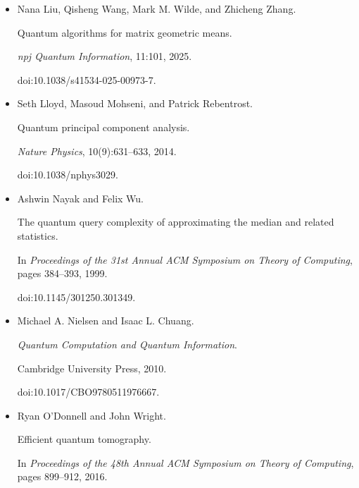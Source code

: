 \documentclass[10pt,a4paper]{article}
\begin{document}
\begin{itemize}
\emph{Computational Complexity}, 2026.


doi:10.1007/s00037-025-00284-5.





\item[] 
[30]

Nana Liu, Qisheng Wang, Mark M. Wilde, and Zhicheng Zhang.


Quantum algorithms for matrix geometric means.


\emph{npj Quantum Information}, 11:101, 2025.


doi:10.1038/s41534-025-00973-7.





\item[] 
[31]

Seth Lloyd, Masoud Mohseni, and Patrick Rebentrost.


Quantum principal component analysis.


\emph{Nature Physics}, 10(9):631–633, 2014.


doi:10.1038/nphys3029.





\item[] 
[32]

Ashwin Nayak and Felix Wu.


The quantum query complexity of approximating the median and related
statistics.


In \emph{Proceedings of the 31st Annual ACM Symposium on Theory of
Computing}, pages 384–393, 1999.


doi:10.1145/301250.301349.





\item[] 
[33]

Michael A. Nielsen and Isaac L. Chuang.


\emph{Quantum Computation and Quantum Information}.


Cambridge University Press, 2010.


doi:10.1017/CBO9780511976667.





\item[] 
[34]

Ryan O’Donnell and John Wright.


Efficient quantum tomography.


In \emph{Proceedings of the 48th Annual ACM Symposium on Theory of
Computing}, pages 899–912, 2016.



\end{itemize}
\end{document}
